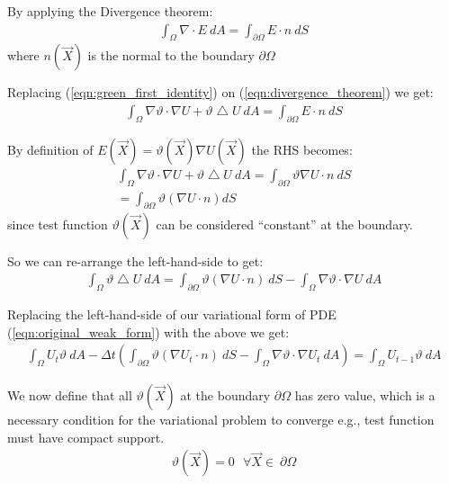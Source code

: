 \documentclass{birkjour}
\numberwithin{equation}{section}
\begin{document}
By applying the Divergence theorem:
\begin{eqnarray}
	\label{eqn:divergence_theorem}
	\int_{\Omega} {\nabla \cdot E \ dA} = \int_{\partial \Omega} { E \cdot n  \ dS }
\end{eqnarray}
where $n(\vec X)$ is the normal to the boundary $\partial \Omega$

Replacing (\ref{eqn:green_first_identity}) on (\ref{eqn:divergence_theorem}) we get:
\begin{eqnarray}
	\int_{\Omega}{ \nabla \vartheta \cdot \nabla U + \vartheta \bigtriangleup U  \ dA} = \int_{\partial \Omega} {  E \cdot n  \ dS } \nonumber
\end{eqnarray}

By definition of $E(\vec X) = \vartheta(\vec X) \nabla U(\vec X)$ the RHS becomes:
\begin{eqnarray}
	\int_{\Omega}{ \nabla \vartheta \cdot \nabla U + \vartheta \bigtriangleup U  \ dA} = \int_{\partial \Omega} { \vartheta \nabla U \cdot n  \ dS } \nonumber \\
	= \int_{\partial \Omega} { \vartheta \left( \nabla U \cdot n\right) dS }
\end{eqnarray}
since test function $\vartheta(\vec X)$ can be considered ``constant'' at the boundary.

So we can re-arrange the left-hand-side to get:
\begin{eqnarray}
	\int_{\Omega}{\vartheta \bigtriangleup U  \ dA} = \int_{\partial \Omega} { \vartheta \left( \nabla U \cdot n\right)  \ dS } - \int_{\Omega}{ \nabla \vartheta \cdot \nabla U  \ dA}
\end{eqnarray}

Replacing the left-hand-side of our variational form of PDE (\ref{eqn:original_weak_form}) with the above we get:
 \begin{eqnarray}
	\label{eqn:standard_weak_form}
	\int_{\Omega}{ U_t \vartheta \ dA } - \Delta t \left(\int_{\partial \Omega} { \vartheta \left( \nabla U_t \cdot n\right)  \ dS } - \int_{\Omega}{ \nabla \vartheta \cdot \nabla U_t \ dA}\right) = \int_{\Omega} { U_{t-1} \vartheta \ dA }
\end{eqnarray}

We now define that all $\vartheta(\vec X)$ at the boundary $\partial \Omega$ has zero value, 
which is a necessary condition for the variational problem to converge e.g., test function must have compact support.
\begin{eqnarray}
	\vartheta(\vec X) = 0  \ \ \  \forall \vec X \in \ \partial \Omega
\end{eqnarray}
\end{document}
